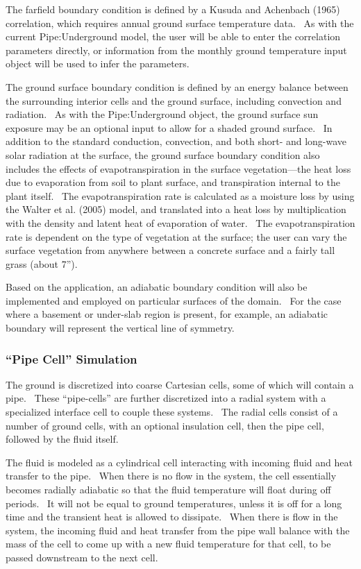 The farfield boundary condition is defined by a Kusuda and Achenbach (1965) correlation, which requires annual ground surface temperature data.~ As with the current Pipe:Underground model, the user will be able to enter the correlation parameters directly, or information from the monthly ground temperature input object will be used to infer the parameters.

The ground surface boundary condition is defined by an energy balance between the surrounding interior cells and the ground surface, including convection and radiation.~ As with the Pipe:Underground object, the ground surface sun exposure may be an optional input to allow for a shaded ground surface.~ In addition to the standard conduction, convection, and both short- and long-wave solar radiation at the surface, the ground surface boundary condition also includes the effects of evapotranspiration in the surface vegetation---the heat loss due to evaporation from soil to plant surface, and transpiration internal to the plant itself.~ The evapotranspiration rate is calculated as a moisture loss by using the Walter et al. (2005) model, and translated into a heat loss by multiplication with the density and latent heat of evaporation of water.~ The evapotranspiration rate is dependent on the type of vegetation at the surface; the user can vary the surface vegetation from anywhere between a concrete surface and a fairly tall grass (about 7'').

Based on the application, an adiabatic boundary condition will also be implemented and employed on particular surfaces of the domain.~ For the case where a basement or under-slab region is present, for example, an adiabatic boundary will represent the vertical line of symmetry.

\subsubsection{``Pipe Cell'' Simulation}\label{pipe-cell-simulation}

The ground is discretized into coarse Cartesian cells, some of which will contain a pipe.~ These ``pipe-cells'' are further discretized into a radial system with a specialized interface cell to couple these systems.~ The radial cells consist of a number of ground cells, with an optional insulation cell, then the pipe cell, followed by the fluid itself.

The fluid is modeled as a cylindrical cell interacting with incoming fluid and heat transfer to the pipe.~ When there is no flow in the system, the cell essentially becomes radially adiabatic so that the fluid temperature will float during off periods.~ It will not be equal to ground temperatures, unless it is off for a long time and the transient heat is allowed to dissipate.~ When there is flow in the system, the incoming fluid and heat transfer from the pipe wall balance with the mass of the cell to come up with a new fluid temperature for that cell, to be passed downstream to the next cell.

